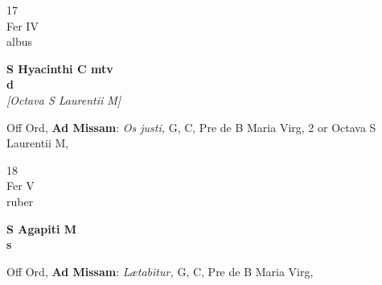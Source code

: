 \documentclass[10pt, openany]{book}
\begin{document}
        \begin{center}
            \begin{minipage}{3.5in}
                \vspace{2em}
                \begin{minipage}{0.5in}
                    {\Huge 17} \\
                    {\normalsize Fer IV} \\
                    {\normalsize albus}
                \end{minipage}
                \begin{minipage}{3.0in}
                    \textbf{ \large S Hyacinthi C mtv \\
                    \textnormal{\normalsize d}} \\ \textit{[Octava S Laurentii M]} \\ 
                \end{minipage}
                \begin{justify}Off Ord, \textbf{Ad Missam}: \textit{Os justi,} G, C, Pre de B Maria Virg, 2 or Octava S Laurentii M,   
                \end{justify}
            \end{minipage}
        \end{center}
    
        \begin{center}
            \begin{minipage}{3.5in}
                \vspace{2em}
                \begin{minipage}{0.5in}
                    {\Huge 18} \\
                    {\normalsize Fer V} \\
                    {\normalsize ruber}
                \end{minipage}
                \begin{minipage}{3.0in}
                    \textbf{ \large S Agapiti M \\
                    \textnormal{\normalsize s}} \\ 
                \end{minipage}
                \begin{justify}Off Ord, \textbf{Ad Missam}: \textit{Lætabitur,} G, C, Pre de B Maria Virg,   
                \end{justify}
            \end{minipage}
        \end{center}
    
\end{document}
